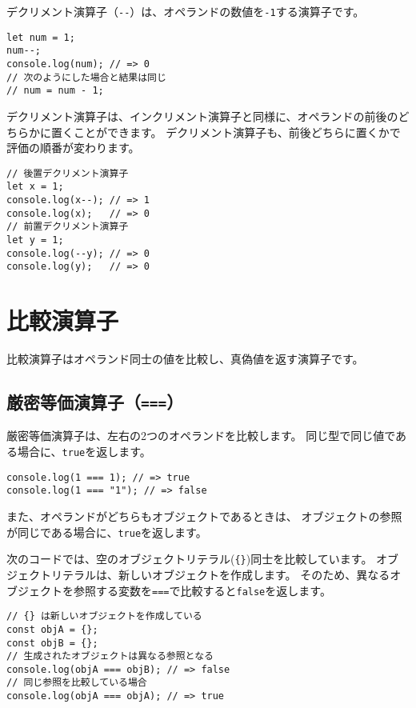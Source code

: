 デクリメント演算子（\texttt{-\/-}）は、オペランドの数値を\texttt{-1}する演算子です。

\begin{lstlisting}
let num = 1;
num--;
console.log(num); // => 0
// 次のようにした場合と結果は同じ
// num = num - 1;
\end{lstlisting}

デクリメント演算子は、インクリメント演算子と同様に、オペランドの前後のどちらかに置くことができます。
デクリメント演算子も、前後どちらに置くかで評価の順番が変わります。

\begin{lstlisting}
// 後置デクリメント演算子
let x = 1;
console.log(x--); // => 1
console.log(x);   // => 0
// 前置デクリメント演算子
let y = 1;
console.log(--y); // => 0
console.log(y);   // => 0
\end{lstlisting}

\hypertarget{comparison-operator}{%
\section{比較演算子}\label{comparison-operator}}

比較演算子はオペランド同士の値を比較し、真偽値を返す演算子です。

\hypertarget{strict-equal-operator}{%
\subsection{\texorpdfstring{厳密等価演算子（\texttt{===}）}{厳密等価演算子（===）}}\label{strict-equal-operator}}

厳密等価演算子は、左右の2つのオペランドを比較します。
同じ型で同じ値である場合に、\texttt{true}を返します。

\begin{lstlisting}
console.log(1 === 1); // => true
console.log(1 === "1"); // => false
\end{lstlisting}

また、オペランドがどちらもオブジェクトであるときは、
オブジェクトの参照が同じである場合に、\texttt{true}を返します。

次のコードでは、空のオブジェクトリテラル(\texttt{\{\}})同士を比較しています。
オブジェクトリテラルは、新しいオブジェクトを作成します。
そのため、異なるオブジェクトを参照する変数を\texttt{===}で比較すると\texttt{false}を返します。

\begin{lstlisting}
// {} は新しいオブジェクトを作成している
const objA = {};
const objB = {};
// 生成されたオブジェクトは異なる参照となる
console.log(objA === objB); // => false
// 同じ参照を比較している場合
console.log(objA === objA); // => true
\end{lstlisting}

